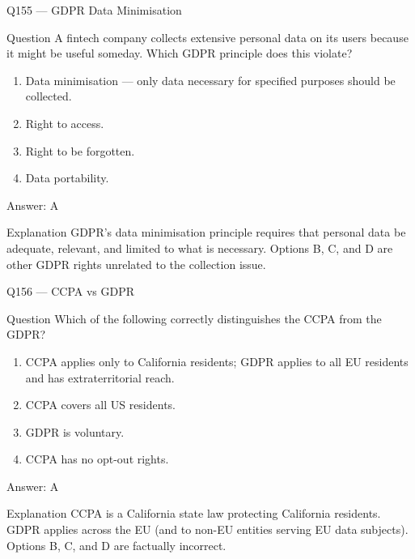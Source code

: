 \documentclass[aspectratio=169,8pt]{beamer}
\begin{document}
\begin{frame}{Q155 --- GDPR Data Minimisation}
\begin{block}{Question}
A fintech company collects extensive personal data on its users because it might be useful someday. Which GDPR principle does this violate?
\begin{enumerate}
\item Data minimisation --- only data necessary for specified purposes should be collected.
\item Right to access.
\item Right to be forgotten.
\item Data portability.
\end{enumerate}  \end{block}
\begin{exampleblock}{Answer: A}\end{exampleblock}
\begin{block}{Explanation}
GDPR's data minimisation principle requires that personal data be adequate, relevant, and limited to what is necessary. Options B, C, and D are other GDPR rights unrelated to the collection issue.
\end{block}
\end{frame}

\begin{frame}{Q156 --- CCPA vs GDPR}
\begin{block}{Question}
Which of the following correctly distinguishes the CCPA from the GDPR?
\begin{enumerate}
\item CCPA applies only to California residents; GDPR applies to all EU residents and has extraterritorial reach.
\item CCPA covers all US residents.
\item GDPR is voluntary.
\item CCPA has no opt-out rights.
\end{enumerate}  \end{block}
\begin{exampleblock}{Answer: A}\end{exampleblock}
\begin{block}{Explanation}
CCPA is a California state law protecting California residents. GDPR applies across the EU (and to non-EU entities serving EU data subjects). Options B, C, and D are factually incorrect.
\end{block}
\end{frame}
\end{document}

